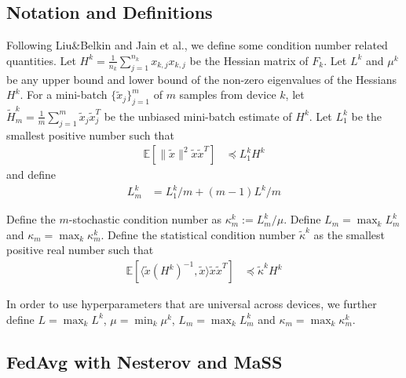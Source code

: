 \subsection{Notation and Definitions}

Following Liu\&Belkin and Jain et al., we define some condition number
related quantities. Let $H^{k}=\frac{1}{n_{k}}\sum_{j=1}^{n_{k}}x_{k,j}x_{k,j}$
be the Hessian matrix of $F_{k}$. Let $L^{k}$ and $\mu^{k}$ be
any upper bound and lower bound of the non-zero eigenvalues of the
Hessians $H^{k}$. For a mini-batch $\{\tilde{x}_{j}\}_{j=1}^{m}$
of $m$ samples from device $k$, let $\tilde{H}_{m}^{k}=\frac{1}{m}\sum_{j=1}^{m}\tilde{x}_{j}\tilde{x}_{j}^{T}$
be the unbiased mini-batch estimate of $H^{k}$. Let $L_{1}^{k}$
be the smallest positive number such that 
\begin{align*}
\mathbb{E}\left[\|\tilde{x}\|^{2}\tilde{x}\tilde{x}^{T}\right] & \preceq L_{1}^{k}H^{k}
\end{align*}
and define 
\begin{align*}
L_{m}^{k} & =L_{1}^{k}/m+(m-1)L^{k}/m
\end{align*}

Define the $m$-stochastic condition number as $\kappa_{m}^{k}:=L_{m}^{k}/\mu$.
Define $L_{m}=\max_{k}L_{m}^{k}$ and $\kappa_{m}=\max_{k}\kappa_{m}^{k}$.
Define the statistical condition number $\tilde{\kappa}^{k}$ as the
smallest positive real number such that 
\begin{align*}
\mathbb{E}\left[\langle\tilde{x}(H^{k})^{-1},\tilde{x}\rangle\tilde{x}\tilde{x}^{T}\right] & \preceq\tilde{\kappa}^{k}H^{k}
\end{align*}

In order to use hyperparameters that are universal across devices,
we further define $L=\max_{k}L^{k}$, $\mu=\min_{k}\mu^{k}$, $L_{m}=\max_{k}L_{m}^{k}$
and $\kappa_{m}=\max_{k}\kappa_{m}^{k}$. 

\subsection{FedAvg with Nesterov and MaSS}

